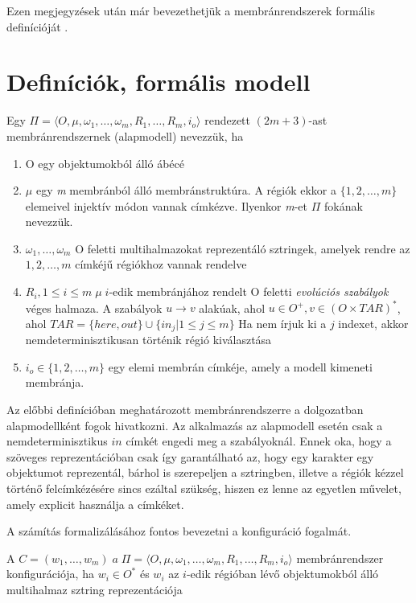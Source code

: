 Ezen megjegyzések után már bevezethetjük a membránrendszerek formális definícióját \cite{tichler_slides}.

\section{Definíciók, formális modell}

\begin{definition}
Egy $\Pi = \langle O, \mu , \omega_1 , \dots , \omega_m, R_1 , \dots , R_m , i_o  \rangle$ rendezett $(2m + 3)$-ast membránrendszernek (alapmodell) nevezzük, ha

\begin{enumerate}
\item O egy objektumokból álló ábécé
\item $\mu$ egy \textit{m} membránból álló membránstruktúra. A régiók ekkor a $\{1,2, \dots, m\}$ elemeivel injektív módon vannak címkézve. Ilyenkor \textit{m}-et $\Pi$ fokának nevezzük.

\item  $\omega_1 , \dots , \omega_m$ O feletti multihalmazokat reprezentáló sztringek, amelyek rendre az $1, 2, \dots, m$ címkéjű régiókhoz vannak rendelve

\item $R_i, 1 \leq i \leq m \; \mu \; i$-edik membránjához rendelt O feletti \textit{evolúciós szabályok} véges halmaza. A szabályok $u \rightarrow v$ alakúak, ahol $u \in O^+, v \in (O \times TAR)^*$, ahol $TAR=\{here, out\} \cup \{ in_j | 1  \leq j \leq m \} $ Ha nem írjuk ki a $j$ indexet, akkor nemdeterminisztikusan történik régió kiválasztása

\item$ i_o \in \{1,2, \dots, m\}$ egy elemi membrán címkéje, amely a modell kimeneti membránja.
\end{enumerate}
\end{definition}

Az előbbi definícióban meghatározott membránrendszerre a dolgozatban alapmodellként fogok hivatkozni. Az alkalmazás az alapmodell esetén csak a nemdeterminisztikus $in$ címkét engedi meg a szabályoknál. Ennek oka, hogy a szöveges reprezentációban csak így garantálható az, hogy egy karakter egy objektumot reprezentál, bárhol is szerepeljen a sztringben, illetve a régiók kézzel történő felcímkézésére sincs ezáltal szükség, hiszen ez lenne az egyetlen művelet, amely explicit használja a címkéket. 

A számítás formalizálásához fontos bevezetni a konfiguráció fogalmát.
\begin{definition}\label{def:mem_sysm}
A $C = (w_1, \dots, w_m)  \; a  \; \Pi = \langle O, \mu , \omega_1 , \dots , \omega_m, R_1 , \dots , R_m , i_o  \rangle$ membránrendszer konfigurációja, ha $w_i \in O^*$ és $w_i$ az $i$-edik régióban lévő objektumokból álló multihalmaz sztring reprezentációja
\end{definition}

